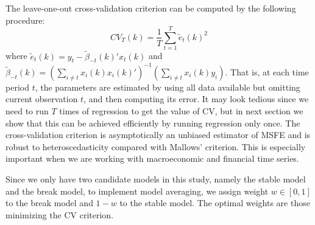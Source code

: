 The leave-one-out cross-validation criterion can be computed by the following procedure:
\begin{equation}
	CV_T(k) = \frac{1}{T}\sum_{t=1}^{T}\tilde{e}_{t}(k)^{2}
\end{equation}
where $\tilde{e}_{t}(k) = y_t - \tilde{\beta}_{-t}(k)'x_t(k)$ and $\tilde{\beta}_{-t}(k) = (\sum_{i\not= t}x_i(k) x_i(k)')^{-1}(\sum_{i\not= t}x_i(k) y_i)$. That is, at each time period $t$, the parameters are estimated by using all data available but omitting current observation $t$, and then computing its error. It may look tedious since we need to run $T$ times of regression to get the value of CV, but in next section we show that this can be achieved efficiently by running regression only once. The cross-validation criterion is asymptotically an unbiased estimator of MSFE and is robust to heteroscedasticity compared with Mallows' criterion. This is especially important when we are working with macroeconomic and financial time series.

Since we only have two candidate models in this study, namely the stable model and the break model, to implement model averaging, we assign weight $w \in [0,1]$ to the break model and $1 - w$ to the stable model. The optimal weights are those minimizing the CV criterion.
